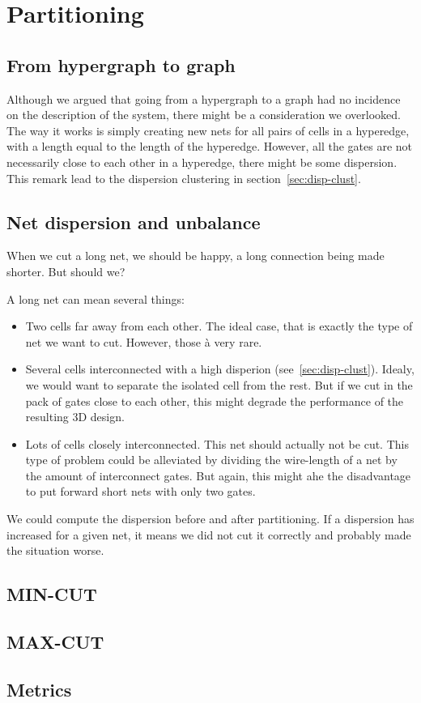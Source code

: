 \section{Partitioning}

\subsection{From hypergraph to graph}
Although we argued that going from a hypergraph to a graph had no incidence on the description of the system, there might be a consideration we overlooked.
The way it works is simply creating new nets for all pairs of cells in a hyperedge, with a length equal to the length of the hyperedge.
However, all the gates are not necessarily close to each other in a hyperedge, there might be some dispersion.
This remark lead to the dispersion clustering in section~\ref{sec:disp-clust}.

\subsection{Net dispersion and unbalance}\label{sec:part-disp}
When we cut a long net, we should be happy, a long connection being made shorter.
But should we?

A long net can mean several things:
\begin{itemize}
	\item Two cells far away from each other. The ideal case, that is exactly the type of net we want to cut. However, those à very rare.
	\item Several cells interconnected with a high disperion (see~\ref{sec:disp-clust}).
	Idealy, we would want to separate the isolated cell from the rest.
	But if we cut in the pack of gates close to each other, this might degrade the performance of the resulting 3D design.
	\item Lots of cells closely interconnected.
	This net should actually not be cut.
	This type of problem could be alleviated by dividing the wire-length of a net by the amount of interconnect gates. But again, this might ahe the disadvantage to put forward short nets with only two gates.
\end{itemize}


We could compute the dispersion before and after partitioning.
If a dispersion has increased for a given net, it means we did not cut it correctly and probably made the situation worse.

\subsection{MIN-CUT}

\subsection{MAX-CUT}

\subsection{Metrics}